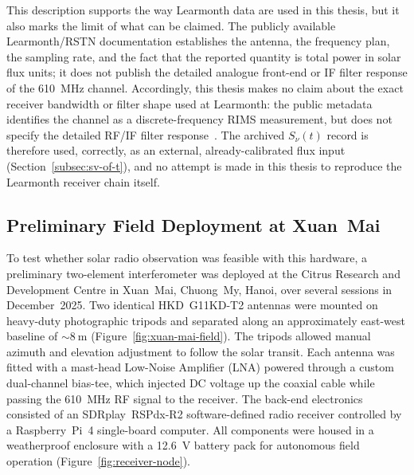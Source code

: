 This description supports the way Learmonth data are used in this thesis, but
it also marks the limit of what can be claimed. The publicly available
Learmonth/RSTN documentation establishes the antenna, the frequency plan, the
sampling rate, and the fact that the reported quantity is total power in
solar flux units; it does not publish the detailed analogue front-end or IF
filter response of the \SI{610}{\mega\hertz} channel. Accordingly, this
thesis makes no claim about the exact receiver bandwidth or filter shape used
at Learmonth: the public metadata identifies the channel as a
discrete-frequency RIMS measurement, but does not specify the detailed RF/IF
filter response~\citep{sws_rims_metadata,rstn_overview}. The archived
$S_\nu(t)$ record is therefore used, correctly, as an external, already-calibrated
flux input (Section~\ref{subsec:sv-of-t}), and no attempt is made in this
thesis to reproduce the Learmonth receiver chain itself.

\subsection{Preliminary Field Deployment at Xuan~Mai}
\label{subsec:field}

To test whether solar radio observation was feasible with this hardware, a
preliminary two-element interferometer was deployed at the Citrus Research and
Development Centre in Xuan~Mai, Chuong~My, Hanoi, over several sessions in
December~2025. Two identical HKD~G11KD-T2 antennas were mounted on heavy-duty
photographic tripods and separated along an approximately east-west baseline of
$\sim\!\SI{8}{\metre}$ (Figure~\ref{fig:xuan-mai-field}). The tripods allowed
manual azimuth and elevation adjustment to follow the solar transit. Each
antenna was fitted with a mast-head Low-Noise Amplifier (LNA) powered through a
custom dual-channel bias-tee, which injected DC voltage up the coaxial cable
while passing the \SI{610}{\mega\hertz} RF signal to the receiver. The back-end
electronics consisted of an SDRplay~RSPdx-R2 software-defined radio receiver
controlled by a Raspberry~Pi~4 single-board computer. All components were housed
in a weatherproof enclosure with a \SI{12.6}{\volt} battery pack for autonomous
field operation (Figure~\ref{fig:receiver-node}).


